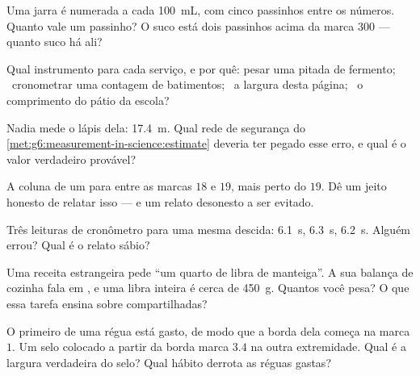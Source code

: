 \begin{exercise}[$\star$]\label{exo:g6:measurement-in-science:4}
Uma jarra é numerada a cada \qty{100}{mL}, com cinco passinhos entre
os números. Quanto vale um passinho? O suco está dois passinhos acima
da marca $300$ --- quanto suco há ali?
\end{exercise}

\begin{exercise}[$\star$]\label{exo:g6:measurement-in-science:5}
Qual instrumento para cada serviço, e por quê: pesar uma pitada de
fermento; \ cronometrar uma contagem de batimentos; \ a largura desta
página; \ o comprimento do pátio da escola?
\end{exercise}

\begin{exercise}[$\star$]\label{exo:g6:measurement-in-science:6}
Nadia mede o lápis dela: \qty{17.4}{m}. Qual rede de segurança do
\cref{met:g6:measurement-in-science:estimate} deveria ter pegado esse
erro, e qual é o valor verdadeiro provável?
\end{exercise}

\begin{exercise}[$\star$]\label{exo:g6:measurement-in-science:7}
A coluna de um  para entre as marcas $18$ e $19$, mais
perto do $19$. Dê um jeito honesto de relatar isso --- e um relato
desonesto a ser evitado.
\end{exercise}

\begin{exercise}[$\star$]\label{exo:g6:measurement-in-science:8}
Três leituras de cronômetro para uma mesma descida: \qty{6.1}{s},
\qty{6.3}{s}, \qty{6.2}{s}. Alguém errou? Qual é o relato sábio?
\end{exercise}

\begin{exercise}[$\star\star$]\label{exo:g6:measurement-in-science:9}
Uma receita estrangeira pede ``um quarto de libra de manteiga''. A
sua balança de cozinha fala em , e uma libra inteira é cerca de
\qty{450}{g}. Quantos  você pesa? O que essa tarefa ensina
sobre  compartilhadas?
\end{exercise}

\begin{exercise}[$\star\star$]\label{exo:g6:measurement-in-science:10}
O primeiro  de uma régua está gasto, de modo que a borda
dela começa na marca $1$. Um selo colocado a partir da borda marca
$3.4$ na outra extremidade. Qual é a largura verdadeira do selo? Qual
hábito derrota as réguas gastas?
\end{exercise}

